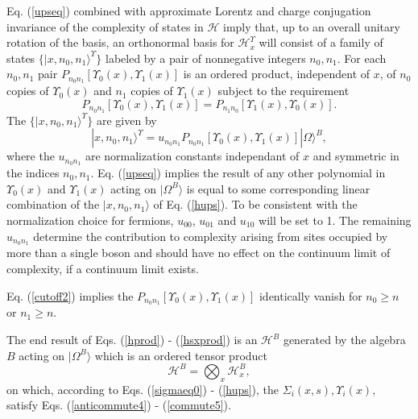 \documentclass[12pt,amsmath,amssymb,onecolumn]{revtex4-2}
\begin{document}
Eq. (\ref{upseq}) combined with
approximate Lorentz and charge conjugation invariance of
the complexity of states in $\mathcal{H}$ imply that,
up to an overall unitary rotation of the basis, an
orthonormal basis for $\mathcal{H}^\Upsilon_x$ will
consist of a family of states $\{|x, n_0, n_1 \rangle ^\Upsilon\}$
labeled by a pair of nonnegative integers $n_0, n_1$.
For each $n_0, n_1$ pair $P_{n_0 n_1}[\Upsilon_0(x),\Upsilon_1(x)]$
is an ordered product, independent of $x$, of $n_0$ copies of $\Upsilon_0(x)$ and
$n_1$ copies of $\Upsilon_1(x)$ subject to the requirement
\begin{equation}
  \label{pn0n1}
  P_{n_0 n_1}[\Upsilon_0(x),\Upsilon_1(x)] = P_{n_1 n_0}[\Upsilon_1(x),\Upsilon_0(x)].
\end{equation}
The $\{|x, n_0, n_1 \rangle ^\Upsilon\}$ are given by
\begin{equation}
    \label{hups}
          | x, n_0, n_1 \rangle ^\Upsilon = u_{n_0 n_1} P_{n_0 n_1}[\Upsilon_0(x),\Upsilon_1(x)] |\Omega \rangle ^B,
\end{equation}
where the $u_{n_0 n_1}$ are normalization constants independant of $x$ and symmetric
in the indices $n_0, n_1$.
Eq. (\ref{upseq})
implies the result of any other
polynomial in $\Upsilon_0( x)$ and $\Upsilon_1( x)$ acting on $|\Omega^B \rangle $
is equal to some corresponding linear combination of the $|x, n_0, n_1 \rangle $ of
Eq. (\ref{hups}).
To be consistent with the normalization choice for fermions, $u_{0 0}$,
$u_{0 1}$ and $u_{1 0}$ will be set to 1. The remaining $u_{n_0 n_1}$ determine
the contribution to complexity arising from sites occupied by more than a single boson
and should have no effect on the continuum limit of complexity, if a continuum limit exists.

Eq. (\ref{cutoff2}) implies the $P_{n_0 n_1}[\Upsilon_0(x),\Upsilon_1(x)]$ identically
vanish for $n_0 \ge n$ or $n_1 \ge n$.

The end result of Eqs. (\ref{hprod}) - (\ref{hsxprod}) is an $\mathcal{H}^B$ generated by
the algebra $B$ acting on $|\Omega^B \rangle $ which is an ordered
tensor product
\begin{equation}
\label{tensorproduct4}
\mathcal{H}^B = \bigotimes_x \mathcal{H}^B_x,
\end{equation}
on which, according to Eqs. (\ref{sigmaeq0}) - (\ref{hups}),
the $\Sigma_i( x, s), \Upsilon_i( x),$ satisfy Eqs. (\ref{anticommute4}) - (\ref{commute5}).
\end{document}
